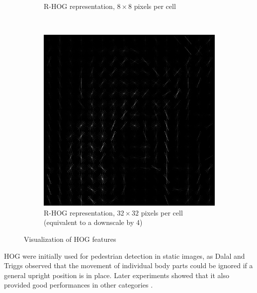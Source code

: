 \begin{figure}[h]
\begin{subfigure}[t]{0.3\textwidth}
        \caption{\acs{R-HOG} representation, $8\times8$ pixels per cell}
        \label{fig:lena_hog:8x8}
    \end{subfigure}
    ~
    \begin{subfigure}[t]{0.3\textwidth}
        \includegraphics[width=\textwidth]{images/lena_hog_32x32}
        \caption{\acs{R-HOG} representation, $32\times32$ pixels per cell (equivalent to a downscale by 4)}
        \label{fig:lena_hog:32x32}
    \end{subfigure}
    \caption{Visualization of \ac{HOG} features}
    \label{fig:lena_hog}
\end{figure}

\ac{HOG} were initially used for pedestrian detection in static images, as Dalal and Triggs observed that the movement of individual body parts could be ignored if a general upright position is in place. Later experiments showed that it also provided good performances in other categories \cite{Malisiewicz2011}.